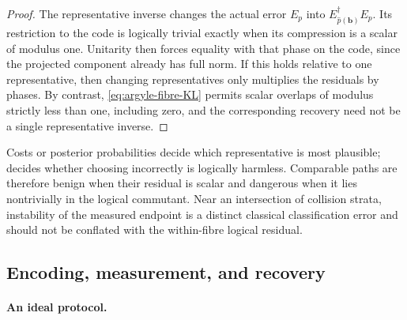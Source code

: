 \documentclass[11pt]{article}
\theoremstyle{definition}
\theoremstyle{remark}
\begin{document}
\begin{proof}
The representative inverse changes the actual error $E_p$ into
$E_{\widehat p(\boldsymbol b)}^\dagger E_p$.  Its restriction to the code is logically trivial exactly when its compression is a scalar of modulus one.  Unitarity then forces equality with that phase on the code, since the projected component already has full norm.  If this holds relative to one representative, then changing representatives only multiplies the residuals by phases.  By contrast, \eqref{eq:argyle-fibre-KL} permits scalar overlaps of modulus strictly less than one, including zero, and the corresponding recovery need not be a single representative inverse.
\end{proof}

Costs or posterior probabilities decide which representative is most plausible;  decides whether choosing incorrectly is logically harmless.  Comparable paths are therefore benign when their residual is scalar and dangerous when it lies nontrivially in the logical commutant.  Near an intersection of collision strata, instability of the measured endpoint is a distinct classical classification error and should not be conflated with the within-fibre logical residual.

\subsection{Encoding, measurement, and recovery}\label{sec:implementation}

\paragraph{An ideal protocol.}
\end{document}
